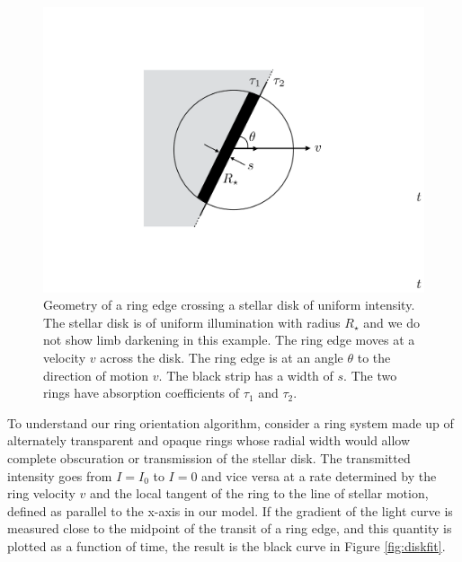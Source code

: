\documentclass{emulateapj}
\begin{document}
\begin{figure}
\centering
\includegraphics[width=\hsize]{fig2}
\caption{Geometry of a ring edge crossing a stellar disk of uniform
intensity. The stellar disk is of uniform illumination with radius
$R_\star$ and we do not show limb darkening in this example.
The ring edge moves at a velocity $v$ across the disk. The ring edge is
at an angle $\theta$ to the direction of motion $v$. The black strip
has a width of $s$. The two rings have absorption coefficients of
$\tau_1$ and $\tau_2$.
\label{fig:edgedisk}}
\end{figure}

To understand our ring orientation algorithm, consider a ring system
made up of alternately transparent and opaque rings whose radial width
would allow complete obscuration or transmission of the stellar disk.
The transmitted intensity goes from $I= I_0$ to $I=0$ and vice versa at
a rate determined by the ring velocity $v$ and the local tangent of the
ring to the line of stellar motion, defined as parallel to the x-axis in
our model.
If the gradient of the light curve is measured close to the midpoint of
the transit of a ring edge, and this quantity is plotted as a function of time,
the result is the black curve in Figure \ref{fig:diskfit}.
\end{document}
